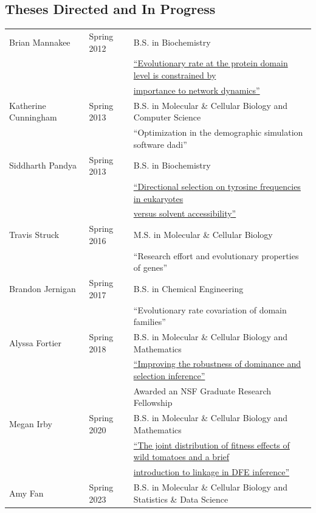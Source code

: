 \documentclass[11pt]{article}
\newcommand{\dadi}{dadi\xspace}
\begin{document}
\subsection*{Theses Directed and In Progress}
\begin{longtable}[l]{l l l}
Brian Mannakee & Spring 2012 & B.S. in Biochemistry\\
 & & \href{http://hdl.handle.net/10150/244452}{``Evolutionary rate at the protein domain level is constrained by}\\
&& \href{http://hdl.handle.net/10150/244452}{importance to network dynamics''}\\
Katherine Cunningham & Spring 2013 & B.S. in Molecular \& Cellular Biology and Computer Science\\
 && ``Optimization in the demographic simulation software  \dadi''\\
 Siddharth Pandya & Spring 2013 & B.S. in Biochemistry\\
 && \href{http://hdl.handle.net/10150/297727}{``Directional selection on tyrosine frequencies in eukaryotes}\\
 &&\href{http://hdl.handle.net/10150/297727}{versus solvent accessibility''}\\
 Travis Struck & Spring 2016 & M.S. in Molecular \& Cellular Biology\\
                    & & ``Research effort and evolutionary properties of genes''\\
Brandon Jernigan & Spring 2017 & B.S. in Chemical Engineering\\
& & ``Evolutionary rate covariation of domain families''\\
Alyssa Fortier & Spring 2018 & B.S. in Molecular \& Cellular Biology and Mathematics\\
&& \href{http://hdl.handle.net/10150/630373}{``Improving the robustness of dominance and selection inference''}\\
&& Awarded an NSF Graduate Research Fellowship\\
Megan Irby & Spring 2020 & B.S. in Molecular \& Cellular Biology and Mathematics\\
&& \href{https://repository.arizona.edu/handle/10150/651036}{``The joint distribution of fitness effects of wild tomatoes and a brief}\\
&& \href{https://repository.arizona.edu/handle/10150/651036}{introduction to linkage in DFE inference''}\\
Amy Fan & Spring 2023 & B.S. in Molecular \& Cellular Biology and Statistics \& Data Science\\

\end{longtable}
\end{document}
